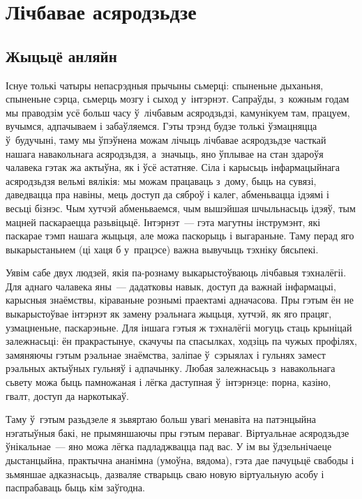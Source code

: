 \chapter{Лічбавае асяродзьдзе}

\section{Жыцьцё анляйн}

Існуе толькі чатыры непасрэдныя прычыны сьмерці: спыненьне дыханьня, спыненьне сэрца, сьмерць мозгу і сыход у~інтэрнэт. Сапраўды, з~кожным годам мы праводзім усё больш часу ў~лічбавым асяродзьдзі, камунікуем там, працуем, вучымся, адпачываем і забаўляемся. Гэты трэнд будзе толькі ўзмацняцца ў~будучыні, таму мы ўпэўнена можам лічыць лічбавае асяродзьдзе часткай нашага навакольнага асяродзьдзя, а~значыць, яно ўплывае на стан здароўя чалавека гэтак жа актыўна, як і ўсё астатняе. Сіла і карысьць інфармацыйнага асяродзьдзя вельмі вялікія: мы можам працаваць з~дому, быць на сувязі, даведвацца пра навіны, мець доступ да сяброў і калег, абменьвацца ідэямі і весьці бізнэс. Чым хутчэй абменьваемся, чым вышэйшая шчыльнасьць ідэяў, тым мацней паскараецца разьвіцьцё. Інтэрнэт~--- гэта магутны інструмэнт, які паскарае тэмп нашага жыцьця, але можа паскорыць і выгараньне. Таму перад яго выкарыстаньнем (ці хаця б у~працэсе) важна вывучыць тэхніку бясьпекі.

Уявім сабе двух людзей, якія па-рознаму выкарыстоўваюць лічбавыя тэхналёгіі. Для аднаго чалавека яны~--- дадатковы навык, доступ да важнай інфармацыі, карысныя знаёмствы, кіраваньне рознымі праектамі адначасова. Пры гэтым ён не выкарыстоўвае інтэрнэт як замену рэальнага жыцьця, хутчэй, як яго працяг, узмацненьне, паскарэньне. Для іншага гэтыя ж тэхналёгіі могуць стаць крыніцай залежнасьці: ён пракрастынуе, скачучы па спасылках, ходзіць па чужых профілях, замяняючы гэтым рэальнае знаёмства, заліпае ў~сэрыялах і гульнях замест рэальных актыўных гульняў і адпачынку. Любая залежнасьць з~навакольнага сьвету можа быць памножаная і лёгка даступная ў~інтэрнэце: порна, казіно, гвалт, доступ да наркотыкаў.

Таму ў~гэтым разьдзеле я зьвяртаю больш увагі менавіта на патэнцыйна нэгатыўныя бакі, не прымяншаючы пры гэтым пераваг. Віртуальнае асяродзьдзе ўнікальнае~--- яно можа лёгка падладжвацца пад вас. У ім вы ўдзельнічаеце дыстанцыйна, практычна ананімна (умоўна, вядома), гэта дае пачуцьцё свабоды і зьмяншае адказнасьць, дазваляе стварыць сваю новую віртуальную асобу і паспрабаваць быць кім заўгодна.

